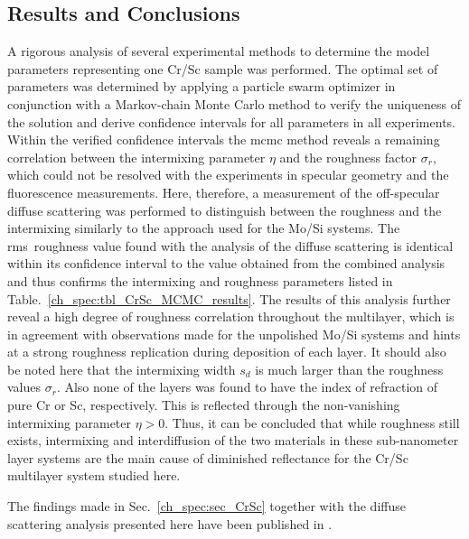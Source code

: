 \subsection{Results and Conclusions}
A rigorous analysis of several experimental methods to determine 
the model parameters representing one Cr/Sc sample was performed. The optimal set of 
parameters was determined by applying a particle swarm optimizer in conjunction 
with a Markov-chain Monte Carlo method to verify the uniqueness of the solution 
and derive confidence intervals for all parameters in all experiments. Within the verified confidence intervals the \gls{mcmc} method reveals a remaining 
correlation between the intermixing parameter $\eta$ and the roughness factor $\sigma_r$, which 
could not be resolved with the experiments in specular geometry and the fluorescence measurements. Here, therefore, a measurement of the off-specular diffuse scattering was performed to distinguish 
between the roughness and the intermixing similarly to the approach used for the Mo/Si systems. The \gls{rms}~roughness value found with the analysis of the diffuse scattering is identical within its confidence interval to the value obtained from the combined analysis and thus confirms the intermixing and roughness parameters listed in Table.~\ref{ch_spec:tbl_CrSc_MCMC_results}. The results of this analysis further reveal a high degree of roughness correlation throughout the multilayer, which is in agreement with observations made for the unpolished Mo/Si systems and hints at a strong roughness replication during deposition of each layer. It should also be noted here that the intermixing width 
$s_d$ is much larger than the roughness values $\sigma_r$. Also none of the 
layers was found to have the index of refraction of pure Cr or Sc, 
respectively. This is reflected through the non-vanishing intermixing parameter 
$\eta>0$. Thus, it can be concluded that while roughness still exists, 
intermixing and interdiffusion of the two materials in these sub-nanometer layer systems are the main cause of diminished reflectance for the Cr/Sc multilayer system studied here.

The findings made in Sec.~\ref{ch_spec:sec_CrSc} together with the diffuse scattering analysis presented here have been published in .